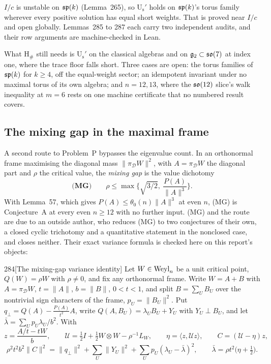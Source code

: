 $I/c$ is unstable on $\mathfrak{sp}(k)$ (Lemma~265), so U$_{\mathrm s}'$ holds on $\mathfrak{sp}(k)$'s torus family wherever every positive solution has equal short weights. That is proved near $I/c$ and open globally. Lemmas~285 to 287 each carry two independent audits, and their row arguments are machine-checked in Lean.

What H$_\#$ still needs is U$_{\mathrm s}'$ on the classical algebras and on $\mathfrak g_2\subset\mathfrak{so}(7)$ at index one, where the trace floor falls short. Three cases are open: the torus families of $\mathfrak{sp}(k)$ for $k\ge4$, off the equal-weight sector; an idempotent invariant under no maximal torus of its own algebra; and $n=12,13$, where the $\mathfrak{so}(12)$ slice's walk inequality at $m=6$ rests on one machine certificate that no numbered result covers.

\subsection{The mixing gap in the maximal frame}\label{sec:mixinggap}

A second route to Problem~P bypasses the eigenvalue count. In an orthonormal frame maximising the diagonal mass $\lVert\pi_{\mathcal D}W\rVert^2$, with $A=\pi_{\mathcal D}W$ the diagonal part and $\rho$ the critical value, the \emph{mixing gap} is the value dichotomy
\[
\textbf{(MG)}\qquad\rho\le\max\Big\{\sqrt{3/2},\ \frac{P(A)}{\lVert A\rVert^3}\Big\}.
\]
With Lemma~57, which gives $P(A)\le\theta_0(n)\lVert A\rVert^3$ at even $n$, (MG) is Conjecture~A at every even $n\ge12$ with no further input. (MG) and the route are due to an outside author, who reduces (MG) to two conjectures of their own, a closed cyclic trichotomy and a quantitative statement in the nonclosed case, and closes neither. Their exact variance formula is checked here on this report's objects:

\begin{Lem}{284}[The mixing-gap variance identity]
Let $W\in\mathrm{Weyl}_n$ be a unit critical point, $Q(W)=\rho W$ with $\rho\ne0$, and fix any orthonormal frame. Write $W=A+B$ with $A=\pi_{\mathcal D}W$, $t=\lVert A\rVert$, $b=\lVert B\rVert$, $0<t<1$, and split $B=\sum_UB_U$ over the nontrivial sign characters of the frame, $p_U=\lVert B_U\rVert^2$. Put $q_\perp=Q(A)-\tfrac{P(A)}{t^2}A$, write $Q(A,B_U)=\lambda_UB_U+Y_U$ with $Y_U\perp B_U$, and let $\bar\lambda=\sum_Up_U\lambda_U/b^2$. With
\[
z=\frac{A/t-tW}b,\qquad\mathcal U=\tfrac12I+\tfrac12W\otimes W-\rho^{-1}L_W,\qquad\eta=\langle z,\mathcal Uz\rangle,\qquad C=(\mathcal U-\eta)z,
\]
\[
\rho^2t^2b^2\lVert C\rVert^2=\lVert q_\perp\rVert^2+\sum_U\lVert Y_U\rVert^2+\sum_Up_U(\lambda_U-\bar\lambda)^2,\qquad\bar\lambda=\rho t^2\big(\eta+\tfrac12\big).
\]
\end{Lem}


